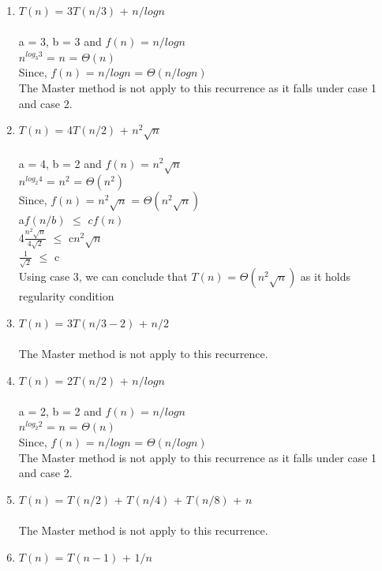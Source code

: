 \documentclass{article}
\begin{document}
\begin{enumerate}
\begin{enumerate}
        \item $T(n)$ = 3$T(n/3)$ + $n/logn$\\\\
        a = 3, b = 3 and $f(n)$ = $n/logn$\\
        $n^{log_3^{}3}$ = $n$ = $\Theta(n)$ \\
        Since, $f(n)$ = $n/logn$ = $\Theta(n/logn)$\\
        The Master method is not apply to this recurrence as it falls under case 1 and case 2.\\
        \item $T(n)$ = 4$T(n/2)$ + $n^2\sqrt{n}$\\\\
        a = 4, b = 2 and $f(n)$ = $n^2\sqrt{n}$\\
        $n^{log_2^{}4}$ = $n^2$  = $\Theta(n^2)$\\
        Since, $f(n)$ = $n^2\sqrt{n}$ = $\Theta(n^2\sqrt{n})$\\
        a$f(n/b)$ $\leq$ $cf(n)$\\
        4$\frac{n^2\sqrt{n}}{4\sqrt{2}}$ $\leq$ c$n^2\sqrt{n}$\\
        $\frac{1}{\sqrt{2}}$ $\leq$ c\\
        Using case 3, we can conclude that $T(n)$ = $\Theta(n^2\sqrt{n})$  as it holds regularity condition\\
        \item $T(n)$ = 3$T(n/3-2)$ + $n/2$\\\\
        The Master method is not apply to this recurrence.\\
        \item $T(n)$ = 2$T(n/2)$ + $n/logn$\\\\
        a = 2, b = 2 and $f(n)$ = $n/logn$\\
        $n^{log_2^{}2}$ = $n$ = $\Theta(n)$\\
        Since, $f(n)$ = $n/logn$ = $\Theta(n/logn)$\\
        The Master method is not apply to this recurrence as it falls under case 1 and case 2.\\
        \item $T(n)$ = $T(n/2)$ + $T(n/4)$ + $T(n/8)$ + $n$\\\\
        The Master method is not apply to this recurrence.\\
        \item $T(n)$ = $T(n-1)$ + $1/n$\\\\

\end{enumerate}
\end{enumerate}
\end{document}
